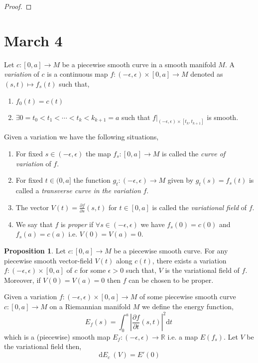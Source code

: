 \documentclass[12pt]{extarticle}
\newcommand{\R}{\mathbb{R}}
\renewcommand{\d}[1]{ \mathrm{d}#1 \:}
\newcommand{\pderiv}[2]{\frac{\partial{#1}}{\partial{#2}}}
\theoremstyle{definition}
\newtheorem{proposition}[theorem]{Proposition}
\newenvironment{definition}[1][Definition:]{\begin{trivlist}
\item[\hskip \labelsep {\bfseries #1}]}{\end{trivlist}}
\begin{document}
\begin{proof}

\end{proof}

\section{March 4}

\begin{definition}
Let $c : [0, a] \to M$ be a piecewise smooth curve in a smooth manifold $M$. A \textit{variation} of $c$ is a continuous map $f : (-\epsilon, \epsilon) \times [0, a] \to M$ denoted as $(s,t) \mapsto f_s(t)$ such that,
\begin{enumerate}
\item $f_0(t) = c(t)$
\item $\exists 0 = t_0 < t_1 < \cdots < t_k < k_{k+1} = a$ such that $f|_{(-\epsilon, \epsilon) \times [t_k, t_{k+1}]}$ is smooth.
\end{enumerate}
Given a variation we have the following situations,
\begin{enumerate}
\item For fixed $s \in (-\epsilon, \epsilon)$ the map $f_s : [0, a] \to M$ is called the \textit{curve of variation} of $f$. 
\item For fixed $t \in (0, a]$ the function $g_t : (-\epsilon, \epsilon) \to M$ given by $g_t(s) = f_s(t)$ is called a \textit{transverse curve in the variation} $f$.
\item The vector $V(t) = \pderiv{f}{s}(s,t)$ for $t \in [0, a]$ is called the \textit{variational field} of $f$. 
\item We say that $f$ is \textit{proper} if $\forall s \in (-\epsilon, \epsilon)$ we have $f_s(0) = c(0)$ and $f_s(a) = c(a)$ i.e. $V(0) = V(a) = 0$. 
\end{enumerate}
\end{definition}

\begin{proposition}
Let $c : [0, a] \to M$ be a piecewise smooth curve. For any piecewise smooth vector-field $V(t)$ along $c(t)$, there exists a variation $f : (-\epsilon, \epsilon) \times [0, a]$ of $c$ for some $\epsilon > 0$ such that, $V$ is the variational field of $f$. Moreover, if $V(0) = V(a) = 0$ then $f$ can be chosen to be proper. 
\end{proposition}

\begin{definition}[Energy Function]
Given a variation $f : (-\epsilon, \epsilon) \times [0, a] \to M$ of some piecewise smooth curve $c : [0, a] \to M$ on a Riemannian manifold $M$ we define the energy function,
\[ E_f(s) = \int_0^a \left| \pderiv{f}{t}(s,t) \right|^2 \d{t} \]
which is a (piecewise) smooth map $E_f : (-\epsilon, \epsilon) \to \R$ i.e. a map $E(f_s)$. Let $V$ be the variational field then,
\[ \d{E_c}(V) = E'(0) \]
\end{definition}
\end{document}
